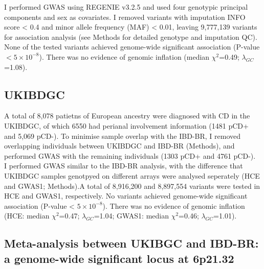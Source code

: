 I performed GWAS using REGENIE v3.2.5 and used four genotypic principal components and sex as covariates. I removed variants with imputation INFO score < 0.4 and minor allele frequency (MAF) < 0.01, leaving 9,777,139 variants for association analysis (see Methods for detailed genotype and imputation QC). None of the tested variants achieved genome-wide significant association (P-value $< 5\times10^{-8}$). There was no evidence of genomic inflation (median $\chi^{2}$=0.49; $\lambda_{GC}$=1.08).
\subsection{UKIBDGC}
A total of 8,078 patietns of European ancestry were diagnosed with CD in the UKIBDGC, of which 6550 had perianal involvement information (1481 pCD+  and 5,069 pCD-). To minimise sample overlap with the IBD-BR, I removed overlapping individuals between UKIBDGC and IBD-BR (Methods), and performed GWAS with the remaining individuals (1303 pCD+ and 4761 pCD-). \\

I performed GWAS similar to the IBD-BR analysis, with the difference that UKIBDGC samples genotpyed on different arrays were analysed seperately (HCE and GWAS1; Methods).A total of 8,916,200 and 8,897,554 variants were tested in HCE and GWAS1, respectively. No variants achieved genome-wide significant association (P-value < $5\times10^{-8}$). There was no evidence of genomic inflation (HCE: median $\chi^{2}$=0.47; $\lambda_{GC}$=1.04; GWAS1: median $\chi^{2}$=0.46; $\lambda_{GC}$=1.01).

\subsection{Meta-analysis between UKIBGC and IBD-BR: a genome-wide significant locus at 6p21.32}

